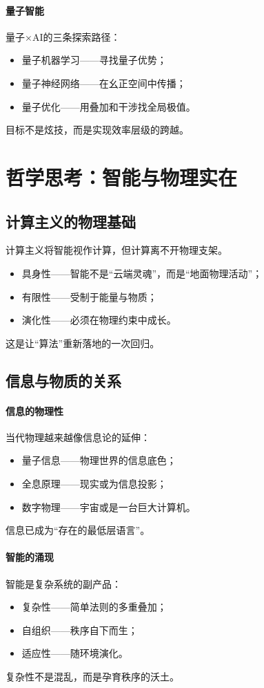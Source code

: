 \paragraph{量子智能}
量子×AI的三条探索路径：
\begin{itemize}
\item 量子机器学习——寻找量子优势；
\item 量子神经网络——在幺正空间中传播；
\item 量子优化——用叠加和干涉找全局极值。
\end{itemize}
目标不是炫技，而是实现效率层级的跨越。

\section{哲学思考：智能与物理实在}

\subsection{计算主义的物理基础}

计算主义将智能视作计算，但计算离不开物理支架。  
\begin{itemize}
\item 具身性——智能不是“云端灵魂”，而是“地面物理活动”；
\item 有限性——受制于能量与物质；
\item 演化性——必须在物理约束中成长。
\end{itemize}
这是让“算法”重新落地的一次回归。

\subsection{信息与物质的关系}

\paragraph{信息的物理性}
当代物理越来越像信息论的延伸：
\begin{itemize}
\item 量子信息——物理世界的信息底色；
\item 全息原理——现实或为信息投影；
\item 数字物理——宇宙或是一台巨大计算机。
\end{itemize}
信息已成为“存在的最低层语言”。

\paragraph{智能的涌现}
智能是复杂系统的副产品：
\begin{itemize}
\item 复杂性——简单法则的多重叠加；
\item 自组织——秩序自下而生；
\item 适应性——随环境演化。
\end{itemize}
复杂性不是混乱，而是孕育秩序的沃土。

